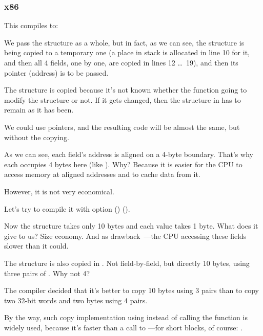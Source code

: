 ﻿\subsubsection{x86}

This compiles to:



We pass the structure as a whole, but in fact, as we can see, the structure
is being copied to a temporary one (a place in stack is allocated in line 10 for it,
and then all 4 fields, one by one, are copied in lines 12 \ldots\ 19), 
and then its pointer (address) is to be passed.

The structure is copied because it's not known whether the \ttf{} 
function going to modify the structure or not.
If it gets changed, then the structure in \main has to remain as it has been.

We could use \CCpp pointers, and the resulting code will be almost the same, but without
the copying.

As we can see, each field's address is aligned on a 4-byte boundary.
That's why each \Tchar occupies 4 bytes here (like \Tint). Why?
Because it is easier for the CPU to access memory at aligned addresses and to cache data from it.

However, it is not very economical.

Let's try to compile it with option () 
().



Now the structure takes only 10 bytes and each \Tchar value takes 1 byte. What does it give to us?
Size economy. And as drawback~---the CPU accessing these fields slower than it could.

\label{short_struct_copying_using_MOV}

The structure is also copied in \main. Not field-by-field, but directly 10 bytes, using three pairs of \MOV.
Why not 4?

The compiler decided that it's better to copy 10 bytes using 3 \MOV pairs than to copy two 32-bit words
and two bytes using 4 \MOV pairs.

By the way, such copy implementation using \MOV instead of calling the  function is widely
used, because it's faster than a call to ---for short blocks, of course:
.

